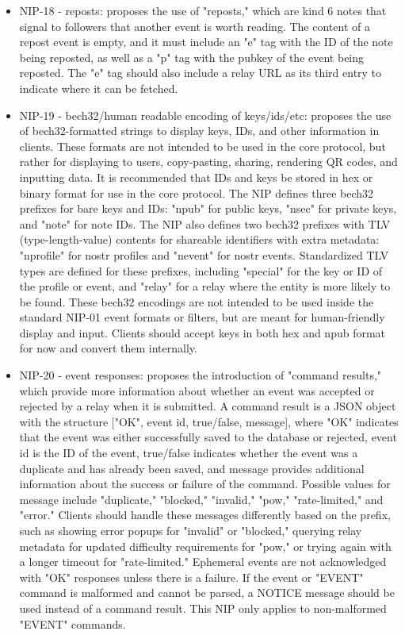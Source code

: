 \begin{itemize}
\item NIP-18 - reposts: proposes the use of "reposts," which are kind 6 notes that signal to followers that another event is worth reading. The content of a repost event is empty, and it must include an "e" tag with the ID of the note being reposted, as well as a "p" tag with the pubkey of the event being reposted. The "e" tag should also include a relay URL as its third entry to indicate where it can be fetched.
\item NIP-19 - bech32/human readable encoding of keys/ids/etc: proposes the use of bech32-formatted strings to display keys, IDs, and other information in clients. These formats are not intended to be used in the core protocol, but rather for displaying to users, copy-pasting, sharing, rendering QR codes, and inputting data. It is recommended that IDs and keys be stored in hex or binary format for use in the core protocol. The NIP defines three bech32 prefixes for bare keys and IDs: "npub" for public keys, "nsec" for private keys, and "note" for note IDs. The NIP also defines two bech32 prefixes with TLV (type-length-value) contents for shareable identifiers with extra metadata: "nprofile" for nostr profiles and "nevent" for nostr events. Standardized TLV types are defined for these prefixes, including "special" for the key or ID of the profile or event, and "relay" for a relay where the entity is more likely to be found. These bech32 encodings are not intended to be used inside the standard NIP-01 event formats or filters, but are meant for human-friendly display and input. Clients should accept keys in both hex and npub format for now and convert them internally.
\item NIP-20 - event responses: proposes the introduction of "command results," which provide more information about whether an event was accepted or rejected by a relay when it is submitted. A command result is a JSON object with the structure ["OK", event id, true/false, message], where "OK" indicates that the event was either successfully saved to the database or rejected, event id is the ID of the event, true/false indicates whether the event was a duplicate and has already been saved, and message provides additional information about the success or failure of the command. Possible values for message include "duplicate," "blocked," "invalid," "pow," "rate-limited," and "error." Clients should handle these messages differently based on the prefix, such as showing error popups for "invalid" or "blocked," querying relay metadata for updated difficulty requirements for "pow," or trying again with a longer timeout for "rate-limited." Ephemeral events are not acknowledged with "OK" responses unless there is a failure. If the event or "EVENT" command is malformed and cannot be parsed, a NOTICE message should be used instead of a command result. This NIP only applies to non-malformed "EVENT" commands.

\end{itemize}

